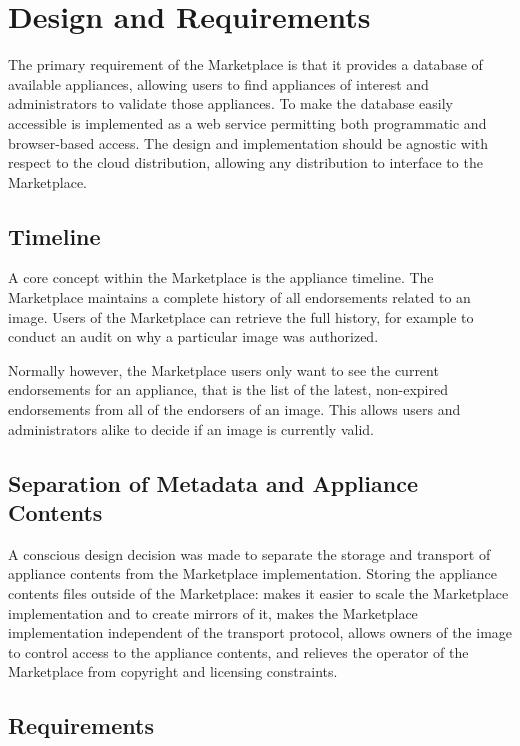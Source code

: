 \section{Design and Requirements}
\label{sec:design}

The primary requirement of the Marketplace is that it provides a
database of available appliances, allowing users to find appliances of
interest and administrators to validate those appliances.  To make the
database easily accessible is implemented as a web service permitting
both programmatic and browser-based access.  The design and
implementation should be agnostic with respect to the cloud
distribution, allowing any distribution to interface to the
Marketplace\@.

\subsection{Timeline}

A core concept within the Marketplace is the appliance timeline.  The
Marketplace maintains a complete history of all endorsements related
to an image.  Users of the Marketplace can retrieve the full history,
for example to conduct an audit on why a particular image was
authorized.

Normally however, the Marketplace users only want to see the current
endorsements for an appliance, that is the list of the latest,
non-expired endorsements from all of the endorsers of an image.  This
allows users and administrators alike to decide if an image is
currently valid.

\subsection{Separation of Metadata and Appliance Contents}

A conscious design decision was made to separate the storage and
transport of appliance contents from the Marketplace implementation.
Storing the appliance contents files outside of the Marketplace: makes
it easier to scale the Marketplace implementation and to create
mirrors of it, makes the Marketplace implementation independent of the
transport protocol, allows owners of the image to control access to
the appliance contents, and relieves the operator of the Marketplace
from copyright and licensing constraints.

\subsection{Requirements}

